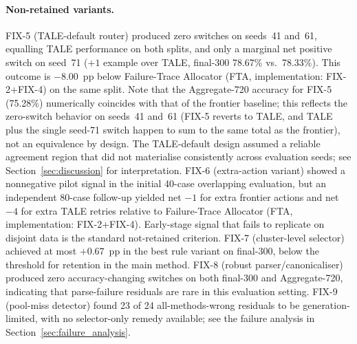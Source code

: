 \paragraph{Non-retained variants.}
FIX-5 (TALE-default router) produced zero switches on seeds~41 and~61,
equalling TALE performance on both splits, and only a marginal net positive
switch on seed~71 ($+1$ example over TALE, final-300 78.67\% vs.\ 78.33\%).
This outcome is $-8.00$~pp below Failure-Trace Allocator (FTA, implementation: FIX-2+FIX-4) on the same split.
Note that the Aggregate-720 accuracy for FIX-5 (75.28\%) numerically coincides
with that of the frontier baseline; this reflects the zero-switch behavior on
seeds~41 and~61 (FIX-5 reverts to TALE, and TALE plus the single seed-71 switch
happen to sum to the same total as the frontier), not an equivalence by design.
The TALE-default design assumed a reliable agreement region that did not
materialise consistently across evaluation seeds; see Section~\ref{sec:discussion}
for interpretation.
FIX-6 (extra-action variant) showed a nonnegative pilot signal in the
initial 40-case overlapping evaluation, but an independent 80-case follow-up
yielded net $-1$ for extra frontier actions and net $-4$ for extra TALE
retries relative to Failure-Trace Allocator (FTA, implementation: FIX-2+FIX-4).
Early-stage signal that fails to replicate on disjoint data is the standard
not-retained criterion.
FIX-7 (cluster-level selector) achieved at most $+0.67$~pp in the best rule
variant on final-300, below the threshold for retention in the main method.
FIX-8 (robust parser/canonicaliser) produced zero accuracy-changing switches on
both final-300 and Aggregate-720, indicating that parse-failure residuals are
rare in this evaluation setting.
FIX-9 (pool-miss detector) found 23 of 24 all-methods-wrong residuals to be
generation-limited, with no selector-only remedy available; see the failure
analysis in Section~\ref{sec:failure_analysis}.
